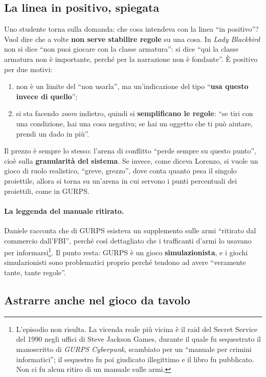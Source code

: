 \subsection{La linea in positivo, spiegata}

Uno studente torna sulla domanda: che cosa intendeva con la linea ``in positivo''? Vuol dire che a
volte \textbf{non serve stabilire regole} su una cosa. In \emph{Lady Blackbird} non si dice ``non
puoi giocare con la classe armatura'': si dice ``qui la classe armatura non è importante, perché
per la narrazione non è fondante''. È positivo per due motivi:
\begin{enumerate}
  \item non è un limite del ``non usarla'', ma un'indicazione del tipo ``\textbf{usa questo invece
        di quello}'';
  \item si sta facendo \emph{zoom} indietro, quindi si \textbf{semplificano le regole}: ``se tiri
        con una condizione, hai una cosa negativa; se hai un oggetto che ti può aiutare, prendi un
        dado in più''.
\end{enumerate}
Il prezzo è sempre lo stesso: l'arena di conflitto ``perde sempre su questo punto'', cioè sulla
\textbf{granularità del sistema}. Se invece, come diceva Lorenzo, si vuole un gioco di ruolo
realistico, ``greve, grezzo'', dove conta quanto pesa il singolo proiettile, allora si torna su
un'arena in cui servono i punti percentuali dei proiettili, come in GURPS.

\paragraph{La leggenda del manuale ritirato.} Daniele racconta che di GURPS esisteva un supplemento
sulle armi ``ritirato dal commercio dall'FBI'', perché così dettagliato che i trafficanti d'armi lo
usavano per informarsi\footnote{L'episodio non risulta. La vicenda reale più vicina è il raid del
Secret Service del 1990 negli uffici di Steve Jackson Games, durante il quale fu sequestrato il
manoscritto di \emph{GURPS Cyberpunk}, scambiato per un ``manuale per crimini informatici''; il
sequestro fu poi giudicato illegittimo e il libro fu pubblicato. Non ci fu alcun ritiro di un
manuale sulle armi.}. Il punto resta: GURPS è un gioco \textbf{simulazionista}, e i giochi
simulazionisti sono problematici proprio perché tendono ad avere ``veramente tante, tante regole''.

\subsection{Astrarre anche nel gioco da tavolo}

